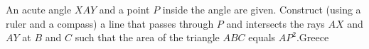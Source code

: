 An acute angle $XAY$ and a point $P$ inside the angle are given. Construct (using a ruler and a compass) a line that passes through $P$ and intersects the rays $AX$ and $AY$ at $B$ and $C$ such that the area of the triangle $ABC$ equals $AP^2$.Greece